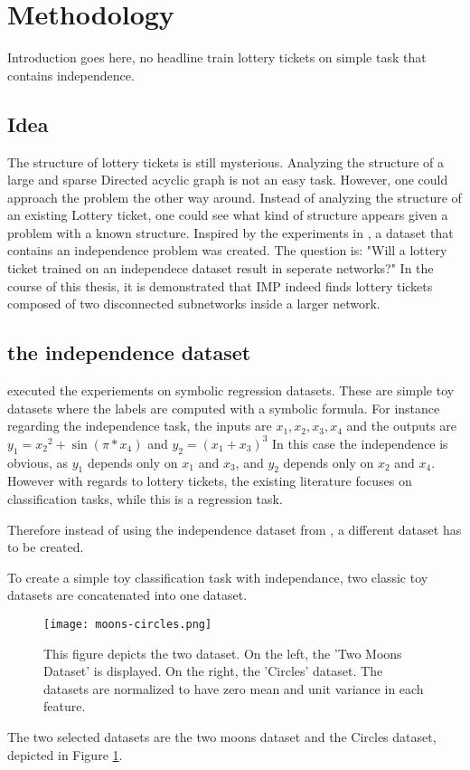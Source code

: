 \section{Methodology}
Introduction goes here, no headline
train lottery tickets on simple task that contains independence.
\subsection{Idea}
The structure of lottery tickets is still mysterious. 
Analyzing the structure of a large and sparse Directed acyclic graph is not an easy task. 
However, one could approach the problem the other way around. 
Instead of analyzing the structure of an existing Lottery ticket, one could see what kind of structure appears given a problem with a known structure.
Inspired by the experiments in \autocite{BIMT}, a dataset that contains an independence problem was created.
The question is:
"Will a lottery ticket trained on an independece dataset result in seperate networks?"
In the course of this thesis, it is demonstrated that IMP indeed finds lottery tickets composed of two disconnected subnetworks inside a larger network.
\subsection{the independence dataset}
\textcite{BIMT} executed the experiements on symbolic regression datasets.
These are simple toy datasets where the labels are computed with a symbolic formula. 
For instance regarding the independence task, the inputs are $x_1, x_2, x_3, x_4$ and the outputs are $y_1={x_2}^2 + \sin{(\pi*x_4)}$ and $y_2=(x_1+x_3)^3$
In this case the independence is obvious, as $y_1$ depends only on $x_1$ and $x_3$, and $y_2$ depends only on $x_2$ and $x_4$.
However with regards to lottery tickets, the existing literature focuses on classification tasks, while this is a regression task.

Therefore instead of using the independence dataset from \autocite{BIMT}, a different dataset has to be created.

To create a simple toy classification task with independance, two classic toy datasets are concatenated into one dataset.
\begin{figure}[ht]
    \centering
    \texttt{[image: moons-circles.png]}
    \caption{This figure depicts the two dataset. On the left, the 'Two Moons Dataset' is displayed. On the right, the 'Circles' dataset. The datasets are normalized to have zero mean and unit variance in each feature.}
    \label{fig:moons_circles}
\end{figure}
The two selected datasets are the two moons dataset and the Circles dataset, depicted in Figure \ref{fig:moons_circles}.

